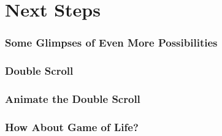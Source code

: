 \documentclass{beamer}
\begin{document}
    \section{Next Steps}\label{sct:allRes}
        \begin{frame}
            \frametitle{Some Glimpses of Even More Possibilities}
        \end{frame}
        \begin{frame}
            \frametitle{Double Scroll}
        \end{frame}
        \begin{frame}
            \frametitle{Animate the Double Scroll}
        \end{frame}
        \begin{frame}
            \frametitle{How About Game of Life?}
        \end{frame}
\end{document}

